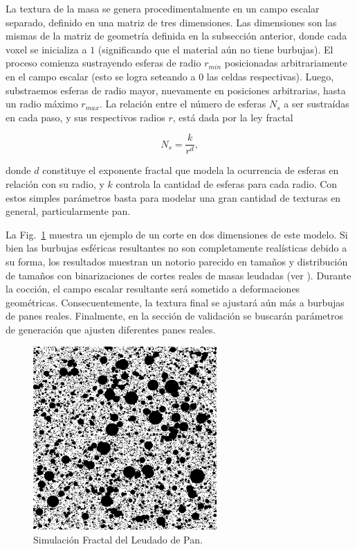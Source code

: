 La textura de la masa se genera procedimentalmente en un campo escalar separado, definido en una matriz de tres dimensiones.
Las dimensiones son las mismas de la matriz de geometría definida en la subsección anterior, donde cada voxel se inicializa a $1$ (significando que el material aún no tiene burbujas).
El proceso comienza sustrayendo esferas de radio $r_{min}$ posicionadas arbitrariamente en el campo escalar (esto se logra seteando a $0$ las celdas respectivas).
Luego, substraemos esferas de radio mayor, nuevamente en posiciones arbitrarias, hasta un radio máximo $r_{max}$.
La relación entre el número de esferas $N_{s}$ a ser sustraídas en cada paso, y sus respectivos radios $r$, está dada por la ley fractal


\begin{equation*}
N_{s} = \frac{k}{r^{d}},
\end{equation*}

donde $d$ constituye el exponente fractal que modela la ocurrencia de esferas en relación con su radio, y $k$ controla la cantidad de esferas para cada radio.
Con estos simples parámetros basta para modelar una gran cantidad de texturas en general, particularmente pan.

La Fig.~\ref{FigProving} muestra un ejemplo de un corte en dos dimensiones de este modelo.
Si bien las burbujas esféricas resultantes no son completamente realísticas debido a su forma, los resultados muestran un notorio parecido en tamaños y distribución de tamaños con binarizaciones de cortes reales de masas leudadas (ver \cite{Babin2006}).
Durante la cocción, el campo escalar resultante será sometido a deformaciones geométricas. Consecuentemente, la textura final se ajustará aún más a burbujas de panes reales.
Finalmente, en la sección de validación se buscarán parámetros de generación que ajusten diferentes panes reales. 

\begin{figure}
\center
\includegraphics[width=7cm]{figures/bubbles}
\caption{Simulación Fractal del Leudado de Pan.}
\label{FigProving}
\end{figure}

